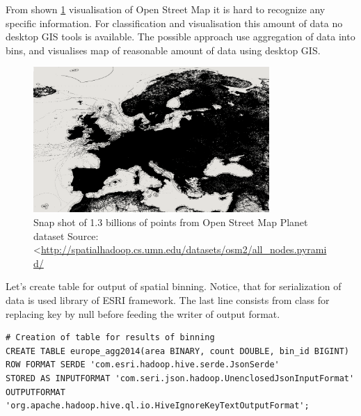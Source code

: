 \documentclass[a4paper,12pt,oneside]{report}
\begin{document}
	From shown \ref{map_eu} visualisation of Open Street Map it is hard to recognize any specific
		information. For classification  and visualisation this amount of data no
		desktop GIS tools is available. The possible approach use aggregation of data into bins, and
		visualises map of reasonable amount of data using desktop GIS.
		\begin{figure}[!htbp]
			\centering
			\includegraphics[width=0.8\textwidth]{./img/eu_all.png}
			\caption[GHF workflow]{\centering Snap shot of 1.3 billions of points from
			Open Street Map Planet dataset \newline
			Source: \textless\url{http://spatialhadoop.cs.umn.edu/datasets/osm2/all_nodes.pyramid/}}
			\label{map_eu}
		\end{figure}
	
Let's create table for output of spatial binning. Notice, that for serialization of data is used library of ESRI framework. 
	The last line consists from class for replacing key by null before feeding the writer of output format.
\begin{footnotesize}
	\begin{lstlisting}[style=python]
# Creation of table for results of binning
CREATE TABLE europe_agg2014(area BINARY, count DOUBLE, bin_id BIGINT)
ROW FORMAT SERDE 'com.esri.hadoop.hive.serde.JsonSerde'              
STORED AS INPUTFORMAT 'com.seri.json.hadoop.UnenclosedJsonInputFormat'
OUTPUTFORMAT 'org.apache.hadoop.hive.ql.io.HiveIgnoreKeyTextOutputFormat';
		\end{lstlisting}
	\end{footnotesize}
	
\end{document}
